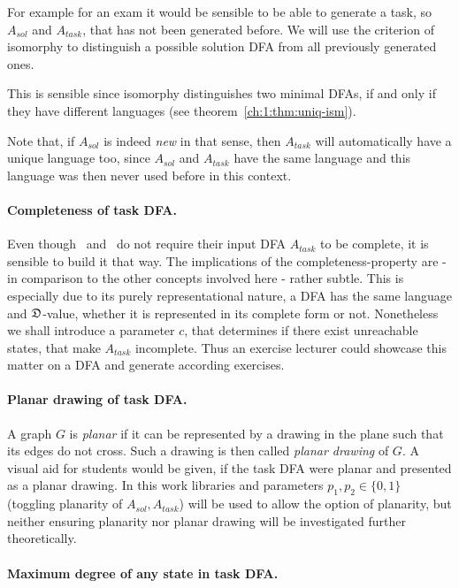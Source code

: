 For example for an exam it would be sensible to be able to generate a task, so $A_{sol}$ and $A_{task}$, that has not been generated before. We will use the criterion of isomorphy to distinguish a possible solution DFA from all previously generated ones.

This is sensible since isomorphy distinguishes two minimal DFAs, if and only if they have different languages (see theorem~\ref{ch:1:thm:uniq-ism}).

Note that, if $A_{sol}$ is indeed \emph{new} in that sense, then $A_{task}$ will automatically have a unique language too, since $A_{sol}$ and $A_{task}$ have the same language and this language was then never used before in this context.

\paragraph*{Completeness of task DFA.}

Even though \CompUnr\ and \RemUnr\ do not require their input DFA $A_{task}$ to be complete, it is sensible to build it that way. The implications of the completeness-property are - in comparison to the other concepts involved here - rather subtle. This is especially due to its purely representational nature, a DFA has the same language and $\mathfrak{D}$-value, whether it is represented in its complete form or not. Nonetheless we shall introduce a parameter $c$, that determines if there exist unreachable states, that make $A_{task}$ incomplete. Thus an exercise lecturer could showcase this matter on a DFA and generate according exercises.

\paragraph*{Planar drawing of task DFA.}

A graph $G$ is \emph{planar} if it can be represented by a drawing in the plane such that its edges do not cross. Such a drawing is then called \emph{planar drawing} of $G$. A visual aid for students would be given, if the task DFA were planar and presented as a planar drawing. In this work libraries and parameters $p_1, p_2 \in \{0,1\}$ (toggling planarity of $A_{sol}, A_{task}$) will be used to allow the option of planarity, but neither ensuring planarity nor planar drawing will be investigated further theoretically.

\paragraph*{Maximum degree of any state in task DFA.}


